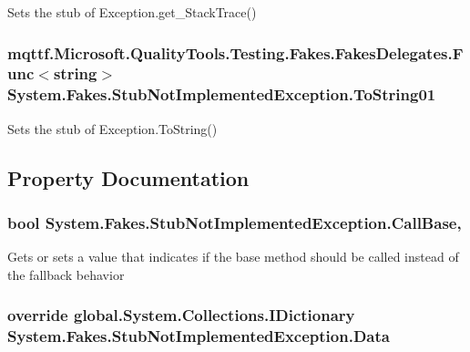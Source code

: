 Sets the stub of Exception.\-get\-\_\-\-Stack\-Trace()

\hypertarget{class_system_1_1_fakes_1_1_stub_not_implemented_exception_af5a87c5d8e5e2935014009662a9adc6c}{
\subsubsection[{To\-String01}]{\setlength{\rightskip}{0pt plus 5cm}mqttf.\-Microsoft.\-Quality\-Tools.\-Testing.\-Fakes.\-Fakes\-Delegates.\-Func$<$string$>$ System.\-Fakes.\-Stub\-Not\-Implemented\-Exception.\-To\-String01}}\label{class_system_1_1_fakes_1_1_stub_not_implemented_exception_af5a87c5d8e5e2935014009662a9adc6c}


Sets the stub of Exception.\-To\-String()



\subsection{Property Documentation}
\hypertarget{class_system_1_1_fakes_1_1_stub_not_implemented_exception_a1cfe4acee57071056dcb00784b0f84b9}{
\subsubsection[{Call\-Base}]{\setlength{\rightskip}{0pt plus 5cm}bool System.\-Fakes.\-Stub\-Not\-Implemented\-Exception.\-Call\-Base\hspace{0.3cm}{\ttfamily [get]}, {\ttfamily [set]}}}\label{class_system_1_1_fakes_1_1_stub_not_implemented_exception_a1cfe4acee57071056dcb00784b0f84b9}


Gets or sets a value that indicates if the base method should be called instead of the fallback behavior

\hypertarget{class_system_1_1_fakes_1_1_stub_not_implemented_exception_adc3830f2f98e36b88a478ea9ea69e255}{
\subsubsection[{Data}]{\setlength{\rightskip}{0pt plus 5cm}override global.\-System.\-Collections.\-I\-Dictionary System.\-Fakes.\-Stub\-Not\-Implemented\-Exception.\-Data\hspace{0.3cm}{\ttfamily [get]}}}\label{class_system_1_1_fakes_1_1_stub_not_implemented_exception_adc3830f2f98e36b88a478ea9ea69e255}


